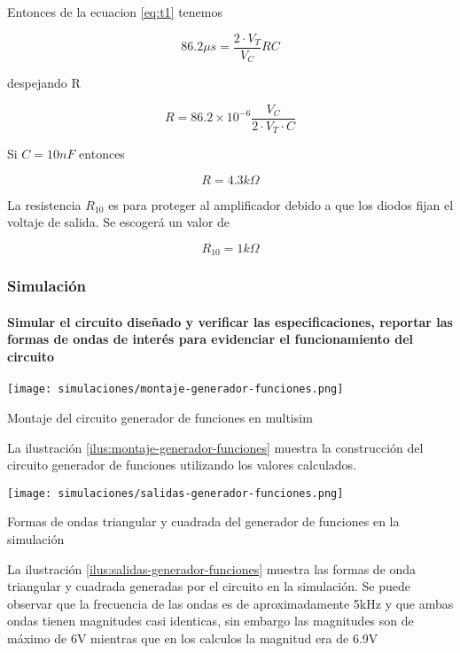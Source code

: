 Entonces de la ecuacion \ref{eq:t1} tenemos

\begin{equation*}
    86.2 \mu s = \frac{2\cdot V_T}{V_C} RC
\end{equation*}

despejando R

\begin{equation}
    R = 86.2 \times10 ^{-6} \frac{V_C}{2 \cdot V_T \cdot C}
\end{equation}

Si $C=10nF$ entonces

\begin{equation}
    R = 4.3k\Omega
\end{equation}

La resistencia $R_{10}$ es para proteger al amplificador debido a que los diodos fijan el voltaje de salida. Se escogerá un valor de

\begin{equation}
    R_{10} = 1k\Omega
\end{equation}

\subsubsection{Simulación}

\paragraph{Simular el circuito diseñado y verificar las especificaciones, reportar las formas de ondas de interés para evidenciar el funcionamiento del circuito} 

\begin{ilustracion}[ht]
    \centering
    \texttt{[image: simulaciones/montaje-generador-funciones.png]}
    \caption{Montaje del circuito generador de funciones en multisim}
    \label{ilus:montaje-generador-funciones}
\end{ilustracion}


La ilustración \ref{ilus:montaje-generador-funciones} muestra la construcción del circuito generador de funciones utilizando los valores calculados.

\begin{ilustracion}[ht]
    \centering
    \texttt{[image: simulaciones/salidas-generador-funciones.png]}
    \caption{Formas de ondas triangular y cuadrada del generador de funciones en la simulación}
    \label{ilus:salidas-generador-funciones}
\end{ilustracion}

La ilustración \ref{ilus:salidas-generador-funciones} muestra las formas de onda triangular y cuadrada generadas por el circuito en la simulación. Se puede observar que la frecuencia de las ondas es de aproximadamente 5kHz y que ambas ondas tienen magnitudes casi identicas, sin embargo las magnitudes son de máximo de 6V mientras que en los calculos la magnitud era de 6.9V